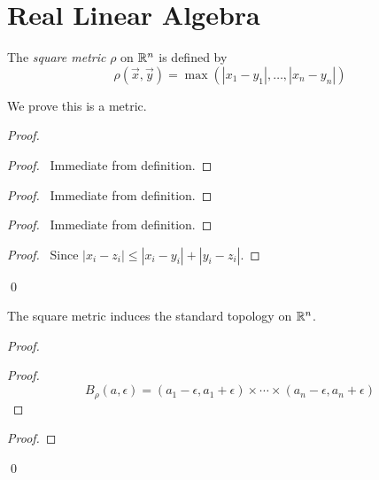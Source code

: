 \section{Real Linear Algebra}

\begin{definition}
    The \emph{square metric} $\rho$ on $\mathbb{R}^n$ is defined by
    \[ \rho(\vec{x}, \vec{y}) = \max(|x_1 - y_1|, \ldots, |x_n - y_n|) \]
\end{definition}

We prove this is a metric.

\begin{proof}
    \pf
    \begin{proof}
        \pf\ Immediate from definition.
    \end{proof}
    \begin{proof}
        \pf\ Immediate from definition.
    \end{proof}
    \begin{proof}
        \pf\ Immediate from definition.
    \end{proof}
    \begin{proof}
        \pf\ Since $|x_i - z_i| \leq |x_i - y_i| + |y_i - z_i|$.
    \end{proof}
    \qed
\end{proof}

\begin{proposition}
    The square metric induces the standard topology on $\mathbb{R}^n$.
\end{proposition}

\begin{proof}
    \pf
    \begin{proof}
        \pf
        \[ B_\rho(a, \epsilon) = (a_1 - \epsilon, a_1 + \epsilon) \times \cdots \times (a_n - \epsilon, a_n + \epsilon) \]
    \end{proof}
    \begin{proof}
    \end{proof}
    \qed
\end{proof}

